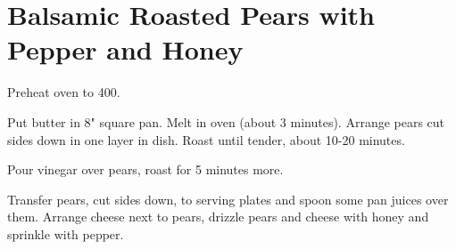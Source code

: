 \section{Balsamic Roasted Pears with Pepper and Honey}
\begin{recipe}



Preheat oven to 400.

Put butter in 8" square pan. Melt in oven (about 3 minutes). Arrange pears cut sides down in one layer in dish. Roast until tender, about 10-20 minutes.

Pour vinegar over pears, roast for 5 minutes more.

Transfer pears, cut sides down, to serving plates and spoon some pan juices over them. Arrange cheese next to pears, drizzle pears and cheese with honey and sprinkle with pepper.



\end{recipe}

